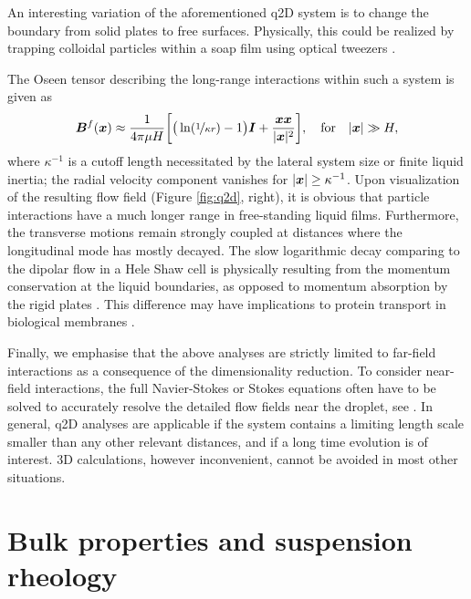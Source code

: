 \medskip
An interesting variation of the aforementioned q2D system is to change the boundary from solid plates to free surfaces. Physically, this could be realized by trapping colloidal particles within a soap film using optical tweezers \citep{Leonardo_etal_2008}.

The Oseen tensor describing the long-range interactions within such a system is given as \citep{Leonardo_etal_2008, Diamant}
\begin{equation}
 \begin{aligned}
   {\bm B}^f({\bm x}) \approx \frac{1}{4\pi\mu H} \bigg[ \big( \ln(\nicefrac{1}{\kappa r}) -1 \big) {\bm I} +\frac{{\bm x}{\bm x} }{ \lvert{\bm x}\rvert^2} \bigg],
   \quad \textrm{for} \quad \lvert\bm x\rvert \gg H,
 \end{aligned}
\end{equation}
where $\kappa^{-1}$ is a cutoff length necessitated by the lateral system size or finite liquid inertia;
\ie the radial velocity component vanishes for $\lvert\bm x\rvert \geq \kappa^{-1}$.%
Upon visualization of the resulting flow field (Figure \ref{fig:q2d}, right),
it is obvious that particle interactions have a much longer range in free-standing liquid films.
Furthermore, the transverse motions remain strongly coupled at distances where the longitudinal mode has mostly decayed.
The slow logarithmic decay comparing to the dipolar flow in a Hele Shaw cell is physically resulting from the momentum conservation at the liquid boundaries,
as opposed to momentum absorption by the rigid plates \citep{Diamant}.
This difference may have implications to protein transport in biological membranes \citep{Saffman3111}.

\medskip
Finally, we emphasise that the above analyses are strictly limited to far-field interactions as a consequence of the dimensionality reduction.
To consider near-field interactions, the full Navier-Stokes or Stokes equations often have to be solved to accurately resolve the detailed flow fields near the droplet, see \eg \cite{zhu_gallaire_2016, flow-assist}. 
In general, q2D analyses are applicable if the system contains a limiting length scale smaller than any other relevant distances, and if a long time evolution is of interest.
3D calculations, however inconvenient, cannot be avoided in most other situations.


\section{Bulk properties and suspension rheology}
\label{sec:sus-rheo}

